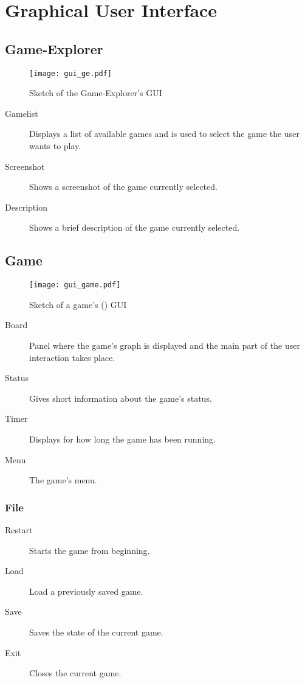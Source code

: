 \section{Graphical User Interface}
\subsection{Game-Explorer}\label{REF:GAME-EXPLORER}

\begin{figure}[h]
	\centering
	\texttt{[image: gui\_ge.pdf]}
	\caption{Sketch of the Game-Explorer's \gls{GUI}}
	\label{img:GE_GUI}
\end{figure}

\begin{description}
	\item[Gamelist] Displays a list of available games and is used to select the game the user wants to play.
	\item[Screenshot] Shows a screenshot of the game currently selected.
	\item[Description] Shows a brief description of the game currently selected.
\end{description}

\subsection{Game} \label{REF:GUI_GAME}

\begin{figure}[H]
	\centering
	\texttt{[image: gui\_game.pdf]}
	\caption{Sketch of a game's (\twixt) \gls{GUI}}
	\label{img:GAME_GUI}
\end{figure}

\begin{description}
	\item[Board] Panel where the game's graph is displayed and the main part of the user interaction takes place.
	\item[Status] Gives short information about the game's status.
	\item[Timer] Displays for how long the game has been running.
	\item[Menu] The game's menu.
\end{description}

\subsubsection{File}
\begin{description}
	\item[Restart] Starts the game from beginning.
	\item[Load] Load a previously saved game.
	\item[Save] Saves the state of the current game.
	\item[Exit] Closes the current game.
\end{description}
